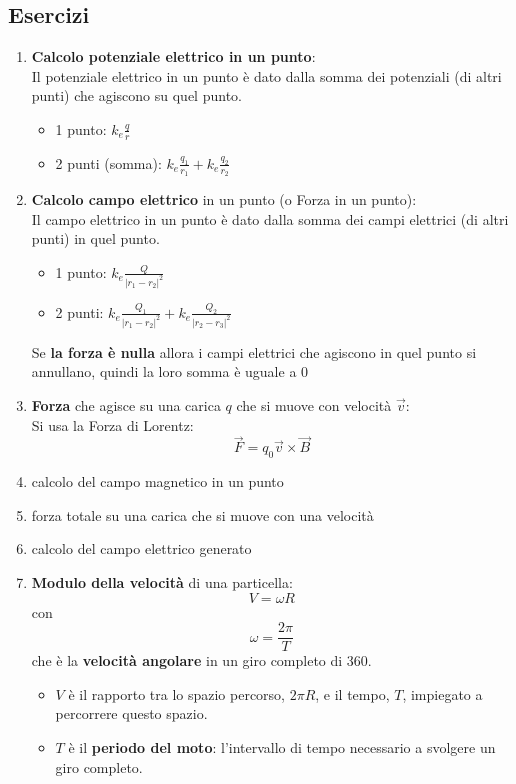 \documentclass{article}
\begin{document}
\subsection{Esercizi}
\begin{enumerate}
  \item \textbf{Calcolo potenziale elettrico in un punto}:
      \\Il potenziale elettrico in un punto è dato dalla somma dei potenziali (di altri punti) che agiscono su quel punto.
      \begin{itemize}
          \item 1 punto: $k_e\frac{q}{r}$
          \item 2 punti (somma): $k_e\frac{q_1}{r_1}+k_e\frac{q_2}{r_2}$
      \end{itemize}
  
  \item \textbf{Calcolo campo elettrico} in un punto (o Forza in un punto):\\
  Il campo elettrico in un punto è dato dalla somma dei campi elettrici (di altri punti) in quel punto.
      \begin{itemize}
          \item 1 punto: $k_e\frac{Q}{|r_1-r_2|^2}$
          \item 2 punti: $k_e\frac{Q_1}{|r_1-r_2|^2}+k_e\frac{Q_2}{|r_2-r_3|^2}$
      \end{itemize}
    
      Se \textbf{la forza è nulla} allora i campi elettrici che agiscono in quel punto si annullano, quindi la loro somma è uguale a $0$
  \item \textbf{Forza} che agisce su una carica $q$ che si muove con velocità $\overrightarrow{v}$:\\
  Si usa la Forza di Lorentz:
  \begin{equation*}
    \overrightarrow{F}=q_0\overrightarrow{v}\times\overrightarrow{B}
  \end{equation*}
  \item calcolo del campo magnetico in un punto
  \item forza totale su una carica che si muove con una velocità
  \item calcolo del campo elettrico generato 
  \item \textbf{Modulo della velocità} di una particella:
  \begin{equation*}
    V=\omega R
  \end{equation*} con
  \begin{equation*}
    \omega=\frac{2\pi}{T}
  \end{equation*} che è la \textbf{velocità angolare} in un giro completo di 360.
  \\
  \begin{itemize}
    \item $V$ è il rapporto tra lo spazio percorso, $2\pi R$, e il tempo, $T$, impiegato a percorrere
    questo spazio.
    \item $T$ è il \textbf{periodo del moto}: l'intervallo di tempo necessario a svolgere un giro completo.  
  \end{itemize}
\end{enumerate}
\end{document}
